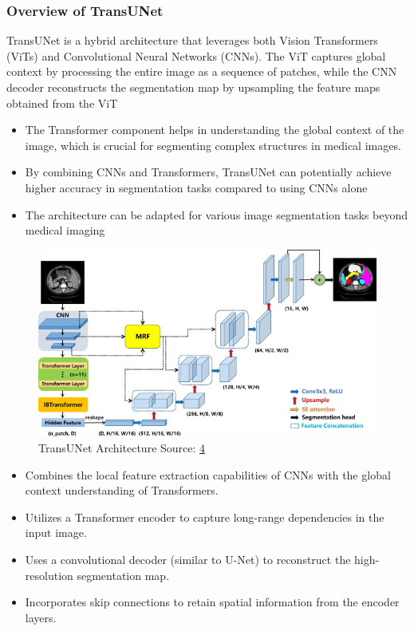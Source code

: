 \documentclass[11pt,a4paper]{article}
\begin{document}
\subsubsection{Overview of TransUNet}
TransUNet is a hybrid architecture that leverages both Vision Transformers (ViTs) and Convolutional Neural Networks (CNNs). The ViT captures global context by processing the entire image as a sequence of patches, while the CNN decoder reconstructs the segmentation map by upsampling the feature maps obtained from the ViT
\begin{itemize}
    \item The Transformer component helps in understanding the global context of the image, which is crucial for segmenting complex structures in medical images.
    \item By combining CNNs and Transformers, TransUNet can potentially achieve higher accuracy in segmentation tasks compared to using CNNs alone
    \item The architecture can be adapted for various image segmentation tasks beyond medical imaging
\end{itemize}
\begin{figure}[H]
    \centering
    \includegraphics[width= 0.9\linewidth]{transUnet_arc.jpg}
    
    \caption{TransUNet Architecture \newline \space Source: \href{https://www.sciencedirect.com/science/article/pii/S1319157823000411}{4}}
    
\end{figure}
\vspace{0.4cm}
\begin{itemize}
    \item Combines the local feature extraction capabilities of CNNs with the global context understanding of Transformers.
    \item Utilizes a Transformer encoder to capture long-range dependencies in the input image.
    \item Uses a convolutional decoder (similar to U-Net) to reconstruct the high-resolution segmentation map.
    \item Incorporates skip connections to retain spatial information from the encoder layers.
\end{itemize}
\end{document}
